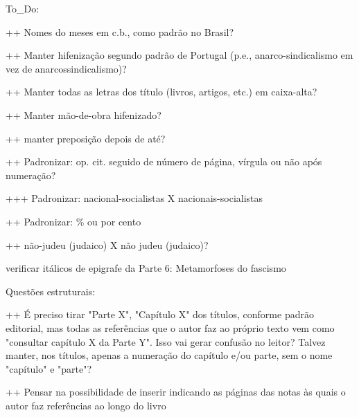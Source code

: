 To_Do:

++ Nomes do meses em c.b., como padrão no Brasil?

++ Manter hifenização segundo padrão de Portugal (p.e., anarco-sindicalismo em vez de anarcossindicalismo)?

++ Manter todas as letras dos título (livros, artigos, etc.) em caixa-alta?

++ Manter mão-de-obra hifenizado?

++ manter preposição depois de até?

++ Padronizar: op. cit. seguido de número de página, vírgula ou não após numeração?


+++ Padronizar: nacional-socialistas X nacionais-socialistas

++ Padronizar: \% ou por cento

++ não-judeu (judaico) X não judeu (judaico)?

verificar itálicos de epigrafe da Parte 6: Metamorfoses do fascismo

Questões estruturais:

++ É preciso tirar "Parte X", "Capítulo X" dos títulos, conforme padrão editorial, mas todas as referências que o autor faz ao próprio texto vem como "consultar capítulo X da Parte Y". Isso vai gerar confusão no leitor? Talvez manter, nos títulos, apenas a numeração do capítulo e/ou parte, sem o nome "capítulo" e "parte"?

++ Pensar na possibilidade de inserir \pageref indicando as páginas das notas às quais o autor faz referências ao longo do livro 

